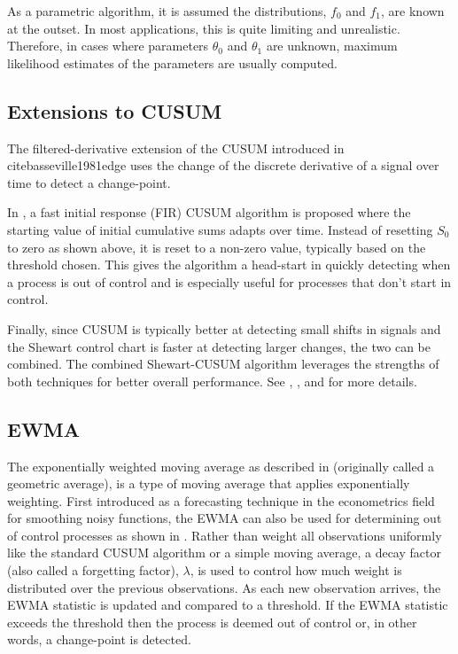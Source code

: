 As a parametric algorithm, it is assumed the distributions, $f_0$ and $f_1$, are known at the outset. In most applications, this is quite limiting and unrealistic. Therefore, in cases where parameters $\theta_0$ and $\theta_1$ are unknown, maximum likelihood estimates of the parameters are usually computed.

\subsection{Extensions to CUSUM}
The filtered-derivative extension of the CUSUM introduced in \\cite{basseville1981edge} uses the change of the discrete derivative of a signal over time to detect a change-point. 

In \cite{lucas1982fast}, a fast initial response (FIR) CUSUM algorithm is proposed where the starting value of initial cumulative sums adapts over time. Instead of resetting $S_0$ to zero as shown above, it is reset to a non-zero value, typically based on the threshold chosen. This gives the algorithm a head-start in quickly detecting when a process is out of control and is especially useful for processes that don't start in control.

Finally, since CUSUM is typically better at detecting small shifts in signals and the Shewart control chart is faster at detecting larger changes, the two can be combined. The combined Shewart-CUSUM algorithm leverages the strengths of both techniques for better overall performance. See \cite{lucas1982combined}, \cite{yashchin1985analysis}, and \cite{westgard1977combined} for more details. 

\subsection{EWMA}
The exponentially weighted moving average as described in \cite{roberts1959control} (originally called a geometric average), is a type of moving average that applies exponentially weighting. First introduced as a forecasting technique in the econometrics field for smoothing noisy functions, the EWMA can also be used for determining out of control processes as shown in \cite{hunter1986exponentially}. Rather than weight all observations uniformly like the standard CUSUM algorithm or a simple moving average, a decay factor (also called a  forgetting factor), $\lambda$, is used to control how much weight is distributed over the previous observations. As each new observation arrives, the EWMA statistic is updated and compared to a threshold. If the EWMA statistic exceeds the threshold then the process is deemed out of control or, in other words, a change-point is detected.


